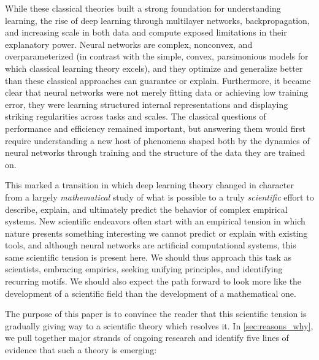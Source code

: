 While these classical theories built a strong foundation for understanding learning, the rise of deep learning through multilayer networks, backpropagation, and increasing scale in both data and compute exposed limitations in their explanatory power.
Neural networks are complex, nonconvex, and overparameterized (in contrast with the simple, convex, parsimonious models for which classical learning theory excels), and they optimize and generalize better than these classical approaches can guarantee or explain.
Furthermore, it became clear that neural networks were not merely fitting data or achieving low training error, they were learning structured internal representations and displaying striking regularities across tasks and scales.
The classical questions of performance and efficiency remained important, but answering them would first require understanding a new host of phenomena shaped both by the dynamics of neural networks through training and the structure of the data they are trained on.


This marked a transition in which deep learning theory changed in character from a largely \textit{mathematical} study of what is possible to a truly \textit{scientific} effort to describe, explain, and ultimately predict the behavior of complex empirical systems.
New scientific endeavors often start with an empirical tension in which nature presents something interesting we cannot predict or explain with existing tools, and although neural networks are artificial computational systems, this same scientific tension is present here.
We should thus approach this task as scientists, embracing empirics, seeking unifying principles, and identifying recurring motifs.
We should also expect the path forward to look more like the development of a scientific field than the development of a mathematical one.

The purpose of this paper is to convince the reader that this scientific tension is gradually giving way to a scientific theory which resolves it.
In \cref{sec:reasons_why}, we pull together major strands of ongoing research and identify five lines of evidence that such a theory is emerging:

